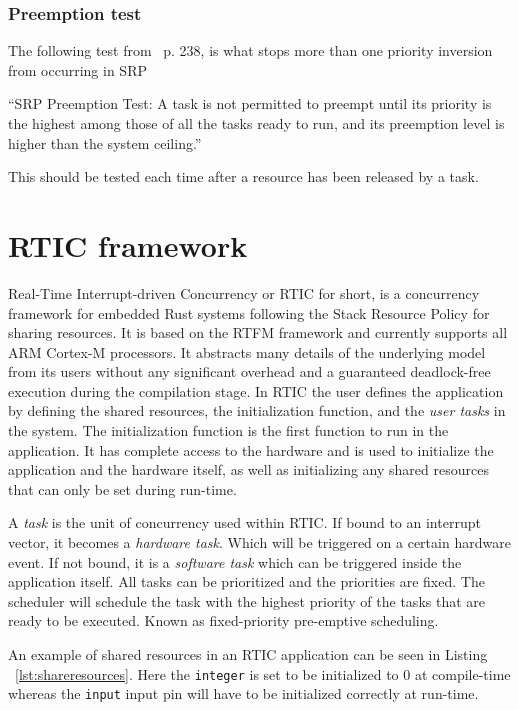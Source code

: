 \subsubsection{Preemption test}
The following test from~\cite{hardrealtimecomputingsystems} p. 238, is what
stops more than one priority inversion from occurring in SRP
\begin{displayquote}
    “SRP Preemption Test: A task is not permitted to preempt until its priority
    is the highest among those of all the tasks ready to run, and its preemption
    level is higher than the system ceiling.”
\end{displayquote}
This should be tested each time after a resource has been released by a task.

\section{RTIC framework}
Real-Time Interrupt-driven Concurrency or RTIC for short, is a concurrency
framework for embedded Rust systems following the Stack Resource Policy for
sharing resources. It is based on the RTFM framework\cite{rtfm} and currently
supports all ARM Cortex-M processors. It abstracts many details of the underlying
model from its users without any significant overhead and a guaranteed
deadlock-free execution during the compilation stage. In RTIC the user defines
the application by defining the shared resources, the initialization function,
and the \emph{user tasks} in the system. The initialization function is the
first function to run in the application. It has complete access to the
hardware and is used to initialize the application and the hardware itself, as
well as initializing any shared resources that can only be set during run-time.

A \emph{task} is the unit of concurrency used within RTIC\@. If bound to an
interrupt vector, it becomes a \emph{hardware task}. Which will be
triggered on a certain hardware event. If not bound, it is a \emph{software
task} which can be triggered inside the application itself. All tasks can
be prioritized and the priorities are fixed. The scheduler will schedule the
task with the highest priority of the tasks that are ready to be executed.
Known as fixed-priority pre-emptive scheduling\cite{fixedpriorityhistory}.

An example of shared resources in an RTIC application can be seen in Listing
~\ref{lst:shareresources}. Here the \texttt{integer} is set to be initialized to
$0$ at compile-time whereas the \texttt{input} input pin will have to be initialized
correctly at run-time.


